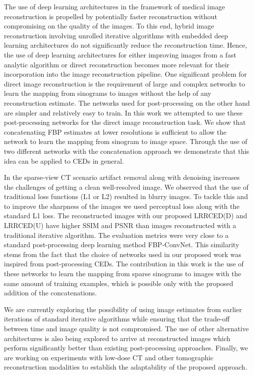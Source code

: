 The use of deep learning architectures in the framework of medical image reconstruction is propelled by potentially faster reconstruction without compromising on the quality of the images. To this end, hybrid image reconstruction involving unrolled iterative algorithms with embedded deep learning architectures do not significantly reduce the reconstruction time. Hence, the use of deep learning architectures for either improving images from a fast analytic algorithm or direct reconstruction becomes more relevant for their incorporation into the image reconstruction pipeline. One significant problem for direct image reconstruction is the requirement of large and complex networks to learn the mapping from sinograms to images without the help of any reconstruction estimate. The networks used for post-processing on the other hand are simpler and relatively easy to train. In this work we attempted to use these post-processing networks for the direct image reconstruction task. We show that concatenating \ac{FBP} estimates at lower resolutions is sufficient to allow the network to learn the mapping from sinogram to image space. Through the use of two different networks with the concatenation approach we demonstrate that this idea can be applied to \acp{CED} in general.   

In the sparse-view \ac{CT} scenario artifact removal along with denoising increases the challenges of getting a clean well-resolved image. We observed that the use of traditional loss functions (L1 or L2) resulted in blurry images. To tackle this and to improve the sharpness of the images we used perceptual loss along with the standard L1 loss. The reconstructed images with our proposed \ac{LRRCED}(D) and \ac{LRRCED}(U) have higher \ac{SSIM} and \ac{PSNR} than images reconstructed with a traditional iterative algorithm. The evaluation metrics were very close to a standard post-processing deep learning method FBP-ConvNet. This similarity stems from the fact that the choice of networks used in our proposed work was inspired from post-processing \acp{CED}. The contribution in this work is the use of these networks to learn the mapping from sparse sinograms to images with the same amount of training examples, which is possible only with the proposed addition of the concatenations.  

We are currently exploring the possibility of using image estimates from earlier iterations of standard iterative algorithms while ensuring that the trade-off between time and image quality is not compromised. The use of other alternative architectures is also being explored to arrive at reconstructed images which perform significantly better than existing post-processing approaches. Finally, we are working on experiments with low-dose \ac{CT} and other tomographic reconstruction modalities to establish the adaptability of the proposed approach.  

